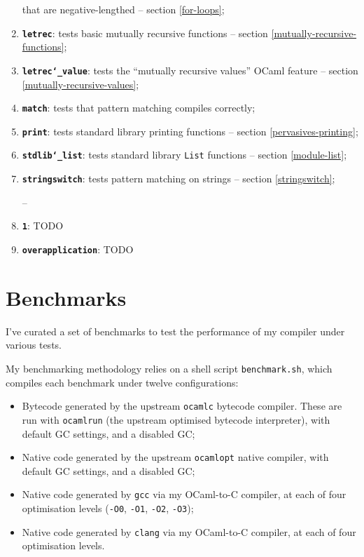 \documentclass[12pt,a4paper,twoside,openright]{report}
\begin{document}
\begin{enumerate}
        that are negative-lengthed -- section \ref{for-loops};
    \item \textbf{\texttt{letrec}}: tests basic mutually recursive functions --
        section \ref{mutually-recursive-functions};
    \item \textbf{\texttt{letrec\char`_value}}: tests the ``mutually recursive
        values'' OCaml feature -- section \ref{mutually-recursive-values};
    \item \textbf{\texttt{match}}: tests that pattern matching compiles
        correctly;
    \item \textbf{\texttt{print}}: tests standard library printing functions --
        section \ref{pervasives-printing};
    \item \textbf{\texttt{stdlib\char`_list}}: tests standard library
        \lstinline!List! functions -- section \ref{module-list};
    \item \textbf{\texttt{stringswitch}}: tests pattern matching on strings --
        section \ref{stringswitch};

--

    \item \textbf{\texttt{1}}: TODO
    \item \textbf{\texttt{overapplication}}: TODO
\end{enumerate}

\section{Benchmarks}\label{benchmarks}

I've curated a set of benchmarks to test the performance of my compiler under
various tests.

My benchmarking methodology relies on a shell script \lstinline!benchmark.sh!,
which compiles each benchmark under twelve configurations:
\begin{itemize}
    \item Bytecode generated by the upstream \lstinline!ocamlc! bytecode compiler. These are run with \lstinline!ocamlrun! (the upstream optimised bytecode interpreter), with default GC settings, and a disabled GC;
    \item Native code generated by the upstream \lstinline!ocamlopt! native compiler, with default GC settings, and a disabled GC;
    \item Native code generated by \lstinline!gcc! via my OCaml-to-C compiler, at each of four optimisation levels (\lstinline!-O0!, \lstinline!-O1!, \lstinline!-O2!, \lstinline!-O3!);
    \item Native code generated by \lstinline!clang! via my OCaml-to-C compiler, at each of four optimisation levels.
\end{itemize}
\end{document}
